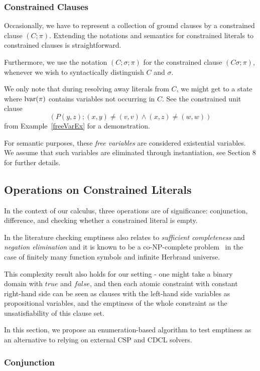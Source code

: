 \documentclass[a4paper]{article}
\begin{document}
\subsubsection*{Constrained Clauses}
Occasionally, we have to represent a collection of ground clauses by a constrained clause $(C; \pi)$. 
Extending the notations and semantics for constrained literals to constrained clauses is straightforward. 

Furthermore, we use the notation $(C; \sigma; \pi)$ for the constrained clause $(C\sigma; \pi)$, whenever we 
wish to syntactically distinguish $C$ and $\sigma$.

We only note that during resolving away literals from $C$, we might get to a state where 
$\operatorname{lvar}(\pi)$ contains variables not occurring in $C$. See the constrained unit clause
\[(P(y,z); (x,y) \ne (v,v) \land (x,z) \ne (w,w))\]
from Example~\ref{freeVarEx} for a demonstration.

For semantic purposes, these \emph{free variables} are considered existential variables.
We assume that such variables are eliminated through instantiation, see Section 8 for further details. 

\subsection{Operations on Constrained Literals}
In the context of our calculus, three operations are of significance: conjunction, difference, 
and checking whether a constrained literal is empty. 



In the literature checking emptiness also relates to \emph{sufficient completeness} and 
\emph{negation elimination}
and it is known to be a co-NP-complete problem~\cite{LassezM87} in the case of finitely many function symbols and infinite Herbrand universe.

This complexity result also holds for our setting - 
one might take a binary domain with $true$ and $false$, and then each atomic constraint with constant right-hand side 
can be seen as clauses with the left-hand side variables as propositional variables, 
and the emptiness of the whole constraint as the unsatisfiability of this clause set.

In this section, we propose an enumeration-based algorithm to test emptiness as an alternative
to relying on external CSP and CDCL solvers.

\subsubsection*{Conjunction}
\end{document}
